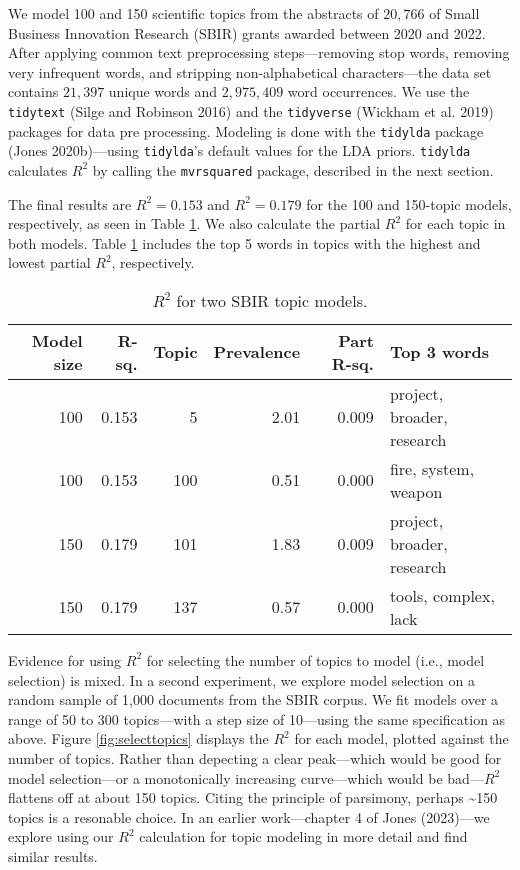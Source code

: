 We model 100 and 150 scientific topics from the abstracts of \(20,766\) of Small Business Innovation Research (SBIR) grants awarded between 2020 and 2022. After applying common text preprocessing steps---removing stop words, removing very infrequent words, and stripping non-alphabetical characters---the data set contains \(21,397\) unique words and \(2,975,409\) word occurrences. We use the \texttt{tidytext} (Silge and Robinson 2016) and the \texttt{tidyverse} (Wickham et al. 2019) packages for data pre processing. Modeling is done with the \texttt{tidylda} package (Jones 2020b)---using \texttt{tidylda}'s default values for the LDA priors. \texttt{tidylda} calculates \(R^2\) by calling the \texttt{mvrsquared} package, described in the next section.

The final results are \(R^2 = 0.153\) and \(R^2 = 0.179\) for the 100 and 150-topic models, respectively, as seen in Table \ref{tab:topicmodeltable}. We also calculate the partial \(R^2\) for each topic in both models. Table \ref{tab:topicmodeltable} includes the top 5 words in topics with the highest and lowest partial \(R^2\), respectively.

\begin{table}

\caption{\label{tab:topicmodeltable}$R^2$ for two SBIR topic models.}
\centering
\begin{tabular}[t]{r|r|r|r|r|l}
\hline
Model size & R-sq. & Topic & Prevalence & Part R-sq. & Top 3 words\\
\hline
100 & 0.153 & 5 & 2.01 & 0.009 & project, broader, research\\
\hline
100 & 0.153 & 100 & 0.51 & 0.000 & fire, system, weapon\\
\hline
150 & 0.179 & 101 & 1.83 & 0.009 & project, broader, research\\
\hline
150 & 0.179 & 137 & 0.57 & 0.000 & tools, complex, lack\\
\hline
\end{tabular}
\end{table}

Evidence for using \(R^2\) for selecting the number of topics to model (i.e., model selection) is mixed. In a second experiment, we explore model selection on a random sample of 1,000 documents from the SBIR corpus. We fit models over a range of 50 to 300 topics---with a step size of 10---using the same specification as above. Figure \ref{fig:selecttopics} displays the \(R^2\) for each model, plotted against the number of topics. Rather than depecting a clear peak---which would be good for model selection---or a monotonically increasing curve---which would be bad---\(R^2\) flattens off at about 150 topics. Citing the principle of parsimony, perhaps \textasciitilde150 topics is a resonable choice. In an earlier work---chapter 4 of Jones (2023)---we explore using our \(R^2\) calculation for topic modeling in more detail and find similar results.

